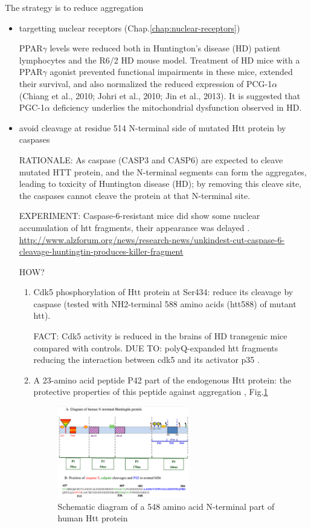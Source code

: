 The strategy is to reduce aggregation
\begin{itemize}
  \item targetting nuclear receptors (Chap.\ref{chap:nuclear-receptors})

PPAR$\gamma$ levels were reduced both in Huntington's disease (HD) patient
lymphocytes and the R6/2 HD mouse model. Treatment of HD mice with a
PPAR$\gamma$ agonist prevented functional impairments in these mice, extended
their survival, and also normalized the reduced expression of PCG-1$\alpha$
(Chiang et al., 2010; Johri et al., 2010; Jin et al., 2013).
It is suggested that PGC-1$\alpha$ deficiency underlies the mitochondrial
dysfunction observed in HD.

  \item avoid cleavage at residue 514 N-terminal side of mutated Htt protein
  by caspases

  RATIONALE: As caspase (CASP3 and CASP6) are expected to cleave mutated HTT
  protein, and the N-terminal segments can form the aggregates, leading to
  toxicity of Huntington disease (HD); by removing this cleave site, the
  caspases cannot cleave the protein at that N-terminal site.
  
  EXPERIMENT: Caspase-6-resistant mice did show some nuclear accumulation of htt
  fragments, their appearance was delayed \citep{wellington2000}.
  \url{http://www.alzforum.org/news/research-news/unkindest-cut-caspase-6-cleavage-huntingtin-produces-killer-fragment}

	HOW?
  \begin{enumerate}
    \item Cdk5 phosphorylation of Htt protein at Ser434: reduce its cleavage by
    caspase (tested with NH2-terminal 588 amino acids (htt588) of mutant htt).
	
	FACT: Cdk5 activity is reduced in the brains of HD transgenic mice compared
	with controls. DUE TO: polyQ-expanded htt fragments reducing the interaction
	between cdk5 and its activator p35 \citep{luo2005}.
	

    \item A 23-amino acid peptide P42 part of the endogenous Htt protein:
    the protective properties of this peptide against aggregation
    \citep{arribat2014, arribat2014s}, Fig.\ref{fig:Huntington_protein-N-terminal}
    
\begin{figure}[h]
\centerline{\includegraphics[height=4cm]{./images/Huntington_protein-N-terminal.eps}}
\caption{Schematic diagram of a 548
amino acid N-terminal part of human Htt protein
}\label{fig:Huntington_protein-N-terminal}
\end{figure} 
     

\end{enumerate}
\end{itemize}
